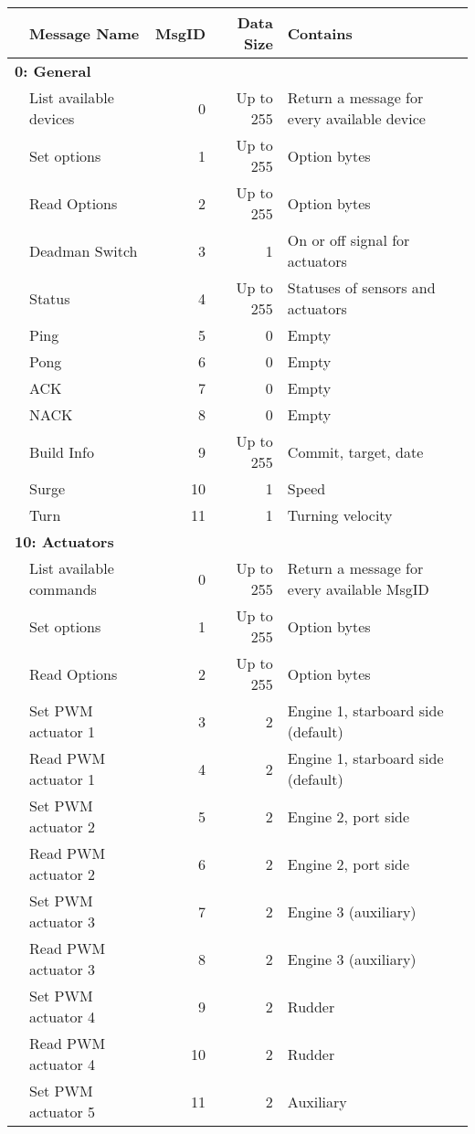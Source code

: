\begin{table}[h]
\centering
	\begin{tabular}{llrrl}
	\toprule
	& \textbf{Message Name} & \textbf{MsgID} & \textbf{Data Size} & \textbf{Contains}\\
	\midrule
	\multicolumn{5}{l}{\textbf{0: General}}\\
	\midrule
	& List available devices & 0 & Up to 255 & Return a message for every available device\\
	& Set options & 1 & Up to 255 & Option bytes\\
	& Read Options & 2 & Up to 255 & Option bytes\\
	& Deadman Switch & 3 & 1 & On or off signal for actuators \\
	& Status & 4 & Up to 255 & Statuses of sensors and actuators \\
	& Ping & 5 & 0 & Empty \\
	& Pong & 6 & 0 & Empty \\
	& ACK & 7 & 0 & Empty \\
	& NACK & 8 & 0 & Empty \\
	& Build Info & 9 & Up to 255 & Commit, target, date\\
	& Surge & 10 & 1 & Speed\\
	& Turn & 11 & 1 & Turning velocity\\
	\midrule
	\multicolumn{5}{l}{\textbf{10: Actuators}}\\
	\midrule
	& List available commands & 0 & Up to 255 & Return a message for every available MsgID\\
	& Set options & 1 & Up to 255 & Option bytes\\
	& Read Options & 2 & Up to 255 & Option bytes\\
	& Set PWM actuator 1  & 3 & 2 & Engine 1, starboard side (default)\\
	& Read PWM actuator 1 & 4 & 2 & Engine 1, starboard side (default)\\
	& Set PWM actuator 2 & 5 & 2 & Engine 2, port side\\
	& Read PWM actuator 2 & 6 & 2 & Engine 2, port side\\
	& Set PWM actuator 3 & 7 & 2 & Engine 3 (auxiliary)\\
	& Read PWM actuator 3 & 8 & 2 & Engine 3 (auxiliary)\\ 
	& Set PWM actuator 4 & 9 & 2 & Rudder\\
	& Read PWM actuator 4 & 10 & 2 & Rudder\\ 
	& Set PWM actuator 5 & 11 & 2 & Auxiliary\\

\end{tabular}
\end{table}

